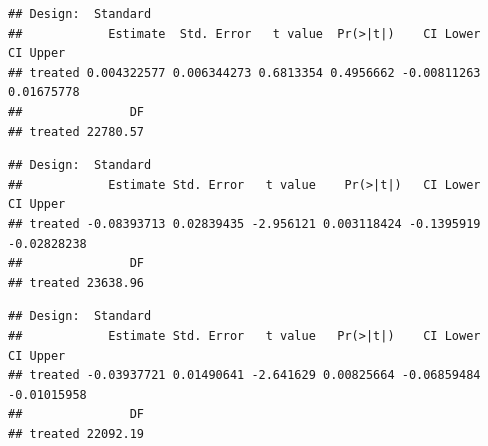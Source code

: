 \documentclass[
]{article}
\newenvironment{Shaded}{\begin{snugshade}}{\end{snugshade}}
\newcommand{\DataTypeTok}[1]{\textcolor[rgb]{0.13,0.29,0.53}{#1}}
\newcommand{\KeywordTok}[1]{\textcolor[rgb]{0.13,0.29,0.53}{\textbf{#1}}}
\newcommand{\NormalTok}[1]{#1}
\newcommand{\OperatorTok}[1]{\textcolor[rgb]{0.81,0.36,0.00}{\textbf{#1}}}
\newcommand{\StringTok}[1]{\textcolor[rgb]{0.31,0.60,0.02}{#1}}
\begin{document}
\begin{verbatim}
## Design:  Standard 
##            Estimate  Std. Error   t value  Pr(>|t|)    CI Lower   CI Upper
## treated 0.004322577 0.006344273 0.6813354 0.4956662 -0.00811263 0.01675778
##               DF
## treated 22780.57
\end{verbatim}

\begin{Shaded}
\end{Shaded}

\begin{verbatim}
## Design:  Standard 
##            Estimate Std. Error   t value    Pr(>|t|)   CI Lower    CI Upper
## treated -0.08393713 0.02839435 -2.956121 0.003118424 -0.1395919 -0.02828238
##               DF
## treated 23638.96
\end{verbatim}

\begin{Shaded}
\end{Shaded}

\begin{verbatim}
## Design:  Standard 
##            Estimate Std. Error   t value   Pr(>|t|)    CI Lower    CI Upper
## treated -0.03937721 0.01490641 -2.641629 0.00825664 -0.06859484 -0.01015958
##               DF
## treated 22092.19
\end{verbatim}
\end{document}
